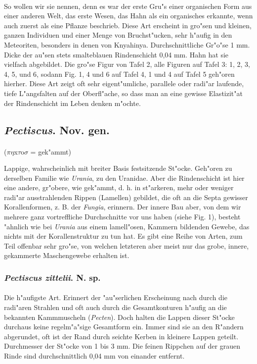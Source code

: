 \documentclass[a4paper, 11pt, oneside]{article}
\begin{document}
\paragraph{}
So wollen wir sie nennen, denn es war der erste Gru"s einer organischen Form aus einer anderen Welt, das erste Wesen, das Hahn als ein organisches erkannte, wenn auch zuerst als eine Pflanze beschrieb. Diese Art erscheint in gro"sen und kleinen, ganzen Individuen und einer Menge von Bruchst"ucken, sehr h"aufig in den Meteoriten, besonders in denen von Knyahinya. Durchschnittliche Gr"o"se 1 mm. Dicke der au"sen stets smalteblauen Rindenschicht 0,04 mm. Hahn hat sie vielfach abgebildet. Die gro"se Figur von Tafel 2, alle Figuren auf Tafel 3: 1, 2, 3, 4, 5, und 6, sodann Fig. 1, 4 und 6 auf Tafel 4, 1 und 4 auf Tafel 5 geh"oren hierher. Diese Art zeigt oft sehr eigent"umliche, parallele oder radi"ar laufende, tiefe L"angsfalten auf der Oberfl"ache, so dass man an eine gewisse Elastizit"at der Rindenschicht im Leben denken m"ochte.
\subsection{\emph{Pectiscus}. Nov. gen.}
\paragraph{}
($\pi\eta$x$\tau$o$\sigma$ = gek"ammt)%

Lappige, wahrscheinlich mit breiter Basis festsitzende St"ocke. Geh"oren zu derselben Familie wie \emph{Urania}, zu den Uranidae. Aber die Rindenschicht ist hier eine andere, gr"obere, wie gek"ammt, d. h. in st"arkeren, mehr oder weniger radi"ar ausstrahlenden Rippen (Lamellen) gebildet, die oft an die Septa gewisser Korallenformen, z. B. der \emph{Fungia}, erinnern. Der innere Bau aber, von dem wir mehrere ganz vortreffliche Durchschnitte vor uns haben (siehe Fig. 1), besteht "ahnlich wie bei \emph{Urania} aus einem lamell"osen, Kammern bildenden Gewebe, das nichts mit der Korallenstruktur zu tun hat. Es gibt eine Reihe von Arten, zum Teil offenbar sehr gro"se, von welchen letzteren aber meist nur das grobe, innere, gekammerte Maschengewebe erhalten ist.
\subsubsection{\emph{Pectiscus zittelii}. N. sp.}
\paragraph{}
Die h"aufigste Art. Erinnert der "au"serlichen Erscheinung nach durch die radi"aren Strahlen und oft auch durch die Gesamtkonturen h"aufig an die bekannten Kammmuscheln (\emph{Pecten}). Doch halten die Lappen dieser St"ocke durchaus keine regelm"a"sige Gesamtform ein. Immer sind sie an den R"andern abgerundet, oft ist der Rand durch seichte Kerben in kleinere Lappen geteilt. Durchmesser der St"ocke von 1 bis 3 mm. Die feinen Rippchen auf der grauen Rinde sind durchschnittlich 0,04 mm von einander entfernt.
\end{document}
